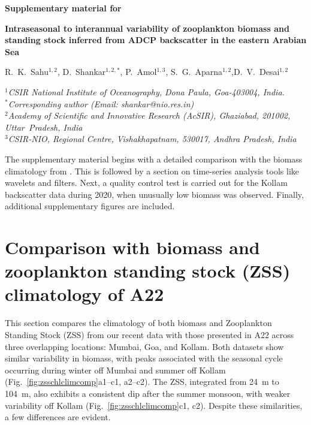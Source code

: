 \documentclass[12pt,a4paper]{article}
\begin{document}
\begin{center}
\textbf{Supplementary material for}

\vspace{5mm}

\textbf{\Large{Intraseasonal to interannual variability of zooplankton biomass and standing stock inferred from ADCP backscatter in the eastern Arabian Sea}}
  
  \vspace{5mm}

  {R.~K.~Sahu$^{1,2}$, D.~Shankar$^{1,2,*}$, P.~Amol$^{1,3}$, S.~G.~Aparna$^{1,2}$,D.~V.~Desai$^{1,2}$}\\
  
  \vspace{5mm}

\textit{$^1$CSIR National Institute of Oceanography, Dona Paula, Goa-403004, India.} \\
    \textit{$^*$Corresponding author (Email: shankar@nio.res.in)} \\
\textit{$^2$Academy of Scientific and Innovative Research (AcSIR), 
	Ghaziabad, 201002, Uttar~Pradesh, India} \\
\textit{$^3$CSIR-NIO, Regional Centre, Vishakhapatnam, 530017, Andhra Pradesh, India}
  \vspace{5mm}

\end{center}
\linenumbers
	The supplementary material begins with a detailed comparison with the biomass climatology from \citet[A22]{aparna2022seasonal}. This is followed by a section on time-series analysis tools like wavelets and filters. Next, a quality control test is carried out for the Kollam backscatter data during 2020, when unusually low biomass was observed. Finally, additional supplementary figures are included.

\section{Comparison with biomass and zooplankton standing stock (ZSS) climatology of A22}
\label{sec:comparison}
This section compares the climatology of both biomass and Zooplankton Standing Stock (ZSS) from our recent data with those presented in A22 across three overlapping locations: Mumbai, Goa, and Kollam. Both datasets show similar variability in biomass, with peaks associated with the seasonal cycle occurring during winter off Mumbai and summer off Kollam (Fig.~\ref{fig:zsschlclimcomp}a1--c1, a2--c2). The ZSS, integrated from 24~m to 104~m, also exhibits a consistent dip after the summer monsoon, with weaker variability off Kollam (Fig.~\ref{fig:zsschlclimcomp}c1, c2). Despite these similarities, a few differences are evident.
\end{document}

